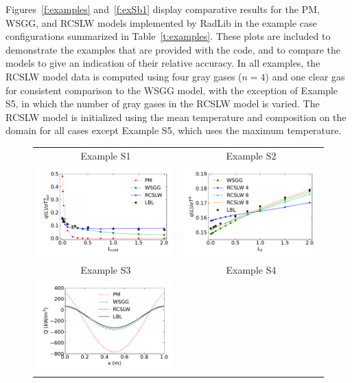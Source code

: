 \documentclass[preprint,12pt]{elsarticle}
\begin{document}
Figures~\ref{f:examples} and~\ref{f:exSb1} display comparative results for the PM, WSGG, and RCSLW models implemented by RadLib in the example case configurations summarized in Table~\ref{t:examples}. These plots are included to demonstrate the examples that are provided with the code, and to compare the models to give an indication of their relative accuracy. In all examples, the RCSLW model data is computed using four gray gases ($n=4$) and one clear gas for consistent comparison to the WSGG model, with the exception of Example S5, in which the number of gray gases in the RCSLW model is varied. The RCSLW model is initialized using the mean temperature and composition on the domain for all cases except Example S5, which uses the maximum temperature. 
%
\begin{figure}
    \begin{center}
    \begin{tabular}{c c}
        Example S1 & Example S2 \\
        \includegraphics[width=2.75 in]{fig_ex_S1.pdf} &
        \includegraphics[width=2.75 in]{fig_ex_S2b.pdf} \\
        Example S3 & Example S4 \\
        \includegraphics[width=2.75 in]{fig_ex_S3a.pdf} &

\end{tabular}
\end{center}
\end{figure}
\end{document}
